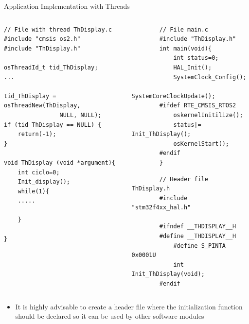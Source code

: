 \begin{frame}[fragile]{Application Implementation with Threads}
    \begin{columns}
        \begin{column}{0.50\textwidth}
            \begin{verbatim}
// File with thread ThDisplay.c
#include "cmsis_os2.h"
#include "ThDisplay.h"

osThreadId_t tid_ThDisplay;
...

tid_ThDisplay = osThreadNew(ThDisplay,
                NULL, NULL);
if (tid_ThDisplay == NULL) {
    return(-1);
}

void ThDisplay (void *argument){
    int ciclo=0;
    Init_display();
    while(1){
    .....

    }

}
            \end{verbatim}
        \end{column}
    \begin{column}{0.50\textwidth}
        \begin{verbatim}
        // File main.c
        #include "ThDisplay.h"
        int main(void){
            int status=0;
            HAL_Init();
            SystemClock_Config();
            SystemCoreClockUpdate();
        #ifdef RTE_CMSIS_RTOS2
            oskernelInitilize();
            status|= Init_ThDisplay();
            osKernelStart();
        #endif
        }
        \end{verbatim}
        \begin{verbatim}
        // Header file ThDisplay.h
        #include "stm32f4xx_hal.h"

        #ifndef __THDISPLAY__H
        #define __THDISPLAY__H
            #define S_PINTA  0x0001U
            int Init_ThDisplay(void);
        #endif

        \end{verbatim}
    \end{column}
    \end{columns}
    \begin{itemize}
        \item It is highly advisable to create a header file where the initialization function should be declared so it can be used by other software modules

    \end{itemize}
\end{frame}
